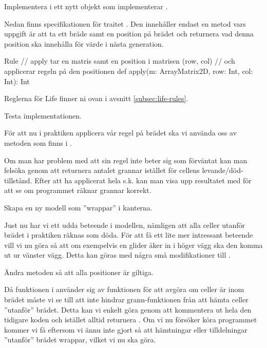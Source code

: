 \Subtask Implementera  i ett nytt objekt  som implementerar .

Nedan finns specifikationen för traitet . Den innehåller endast en metod  vars uppgift är att ta ett bräde samt en position på brädet och returnera vad denna position ska innehålla för värde i nästa generation.

\begin{ScalaSpec}{Rule}
// apply tar en matris samt en position i matrisen (row, col)
// och applicerar regeln på den positionen
def apply(m: ArrayMatrix2D, row: Int, col: Int): Int
\end{ScalaSpec}

Reglerna för Life finner ni ovan i avsnitt \ref{subsec:life-rules}.

\Subtask Testa implementationen.

För att nu i praktiken applicera vår regel på brädet ska vi använda oss av metoden  som finns i .

Om man har problem med att sin regel inte beter sig som förväntat kan man felsöka genom att returnera antalet grannar istället för cellens levande/död-tillstånd. Efter att ha applicerat hela s.k.  kan man visa upp resultatet med  för att se om programmet räknar grannar korrekt.


\Task Skapa en ny modell som ''wrappar'' i kanterna.

Just nu har vi ett udda beteende i modellen, nämligen att alla celler utanför brädet i praktiken räknas som döda. För att få ett lite mer intressant beteende vill vi nu göra så att om exempelvis en glider åker in i höger vägg ska den komma ut ur vänster vägg. Detta kan göras med några små modifikationer till .

\Subtask Ändra metoden  så att alla positioner är giltiga.

Då funktionen  i  använder sig av funktionen  för att avgöra om celler är inom brädet måste vi se till att  inte hindrar grann-funktionen från att hämta celler ''utanför'' brädet. Detta kan vi enkelt göra genom att kommentera ut hela den tidigare koden och istället alltid returnera . Om vi nu försöker köra programmet kommer vi få  eftersom vi ännu inte gjort så att hämtningar eller tilldelningar ''utanför'' brädet wrappar, vilket vi nu ska göra.


